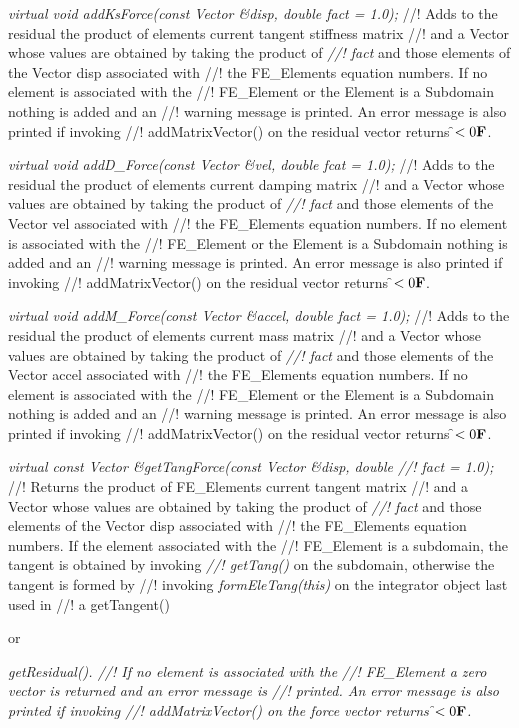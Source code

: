 {{\em virtual void addKsForce(const Vector \&disp, double fact = 1.0);    }
//! Adds to the residual the product of elements current tangent stiffness matrix
//! and a Vector whose values are obtained by taking the product of {\em
//! fact} and those elements of the Vector \p disp associated with 
//! the FE\_Elements equation numbers. If no element is associated with the
//! FE\_Element or the Element is a Subdomain nothing is added and an
//! warning message is printed. An error message is also printed if invoking
//! addMatrixVector() on the residual vector returns \f$< 0{\bf F}$.


{\em virtual void addD\_Force(const Vector \&vel, double fcat = 1.0); }
//! Adds to the residual the product of elements current damping matrix
//! and a Vector whose values are obtained by taking the product of {\em
//! fact} and those elements of the Vector \p vel associated with 
//! the FE\_Elements equation numbers. If no element is associated with the
//! FE\_Element or the Element is a Subdomain nothing is added and an
//! warning message is printed. An error message is also printed if invoking
//! addMatrixVector() on the residual vector returns \f$< 0{\bf F}$.


{\em virtual void addM\_Force(const Vector \&accel, double fact = 1.0); }
//! Adds to the residual the product of elements current mass matrix
//! and a Vector whose values are obtained by taking the product of {\em
//! fact} and those elements of the Vector \p accel associated with 
//! the FE\_Elements equation numbers. If no element is associated with the
//! FE\_Element or the Element is a Subdomain nothing is added and an
//! warning message is printed. An error message is also printed if invoking
//! addMatrixVector() on the residual vector returns \f$< 0{\bf F}$.

{\em virtual const Vector \&getTangForce(const Vector \&disp, double
//! fact = 1.0);    }
//! Returns the product of FE\_Elements current tangent matrix
//! and a Vector whose values are obtained by taking the product of {\em
//! fact} and those elements of the Vector \p disp associated with 
//! the FE\_Elements equation numbers. If the element associated with the
//! FE\_Element is a subdomain, the tangent is obtained by invoking {\em
//! getTang()} on the subdomain, otherwise the tangent is formed by
//! invoking {\em formEleTang(this)} on the integrator object last used in
//! a getTangent()} or {\em getResidual().
//! If no element is associated with the
//! FE\_Element a zero vector is returned and an error message is
//! printed. An error message is also printed if invoking
//! addMatrixVector() on the force vector returns \f$< 0{\bf F}$.

}
